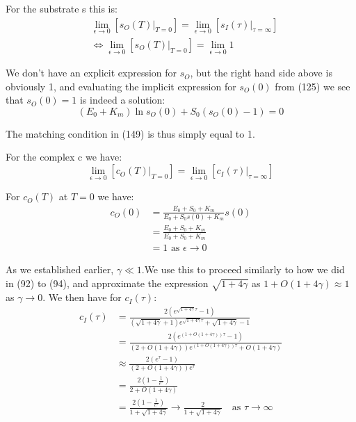 \documentclass[12pt]{article}
\begin{document}
For the substrate s this is:
\begin{align}
&\lim_{\epsilon \to 0} [s_O(T) |_{T=0}] =
  \lim_{\epsilon \to 0} [s_I(\tau) |_{\tau=\infty}] \\
&\iff \lim_{\epsilon \to 0} [s_O(T) |_{T=0}] =
  \lim_{\epsilon \to 0} 1
\end{align}

We don't have an explicit expression for $s_O$, but the right hand
side above is obviously 1, and evaluating the implicit expression for
$s_O(0)$ from (125) we see that $s_O(0)=1$ is indeed a solution:
\begin{equation}
(E_0+K_m) \ln{s_O(0)} + S_0 (s_O(0) - 1) = 0
\end{equation}

The matching condition in (149) is thus simply equal to 1.

For the complex c we have:
\begin{equation}
\lim_{\epsilon \to 0} [c_O(T) |_{T=0}] =
  \lim_{\epsilon \to 0} [c_I(\tau) |_{\tau=\infty}]
\end{equation}


For $c_O(T)$ at $T=0$ we have:
\begin{align}
c_O(0) &= \frac{E_0 + S_0 + K_m}{E_0+S_0 s(0) +K_m} s(0) \\
       &= \frac{E_0 + S_0 + K_m}{E_0+S_0  +K_m} \\
       &= 1 \text { as } \epsilon \to 0
\end{align}

As we established earlier, $\gamma \ll 1$.We use this to proceed
similarly to how we did in (92) to (94), and approximate the
expression $\sqrt{1+4\gamma}$ as $1+O(1+4\gamma) \approx 1$ as
$\gamma \to 0$. We then have for $c_I(\tau)$:
\begin{align}
c_I(\tau) &=
     \frac{2(e^{\sqrt{1+4\gamma} \tau} - 1)}
   {(\sqrt{1+4\gamma} + 1) e^{\sqrt{1+4\gamma} \tau} + \sqrt{1+4\gamma} - 1} \\
&= \frac{2(e^{(1+O(1+4\gamma)) \tau} - 1)}
        {(2 + O(1+4\gamma)) e^{(1+O(1+4\gamma)) \tau} + O(1+4\gamma)} \\
&\approx \frac{2(e^{\tau} - 1)}
              {(2 + O(1+4\gamma)) e^{\tau}} \\
&= \frac{2(1 - \frac{1}{e^{\tau}})}
        {2 + O(1+4\gamma)} \\
&= \frac{2(1 - \frac{1}{e^{\tau}})}
        {1 + \sqrt{1+4\gamma}}
   \to \frac{2} {1 + \sqrt{1+4\gamma}} \quad \text{as } \tau \to \infty
\end{align}
\end{document}
